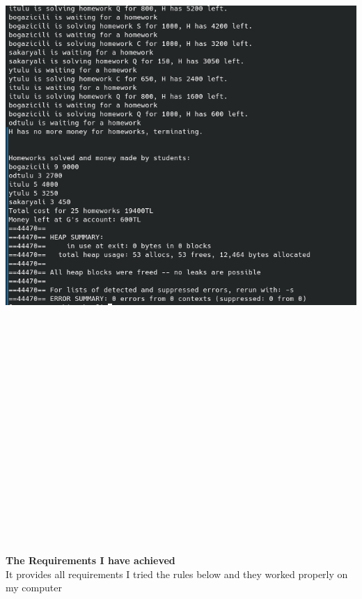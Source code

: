 \documentclass{report}
\begin{document}
\includegraphics[width=\textwidth,height=\textheight,keepaspectratio]{images/valgrind.png}\\\\\\\\\\\\\\\\\\\\\\\\\\\\\\\\\\\\\\

{\huge \textbf{The Requirements I have achieved} \\}
{\large It provides all requirements }
 {\large I tried the rules below and they worked properly on my computer}
 
\end{document}
